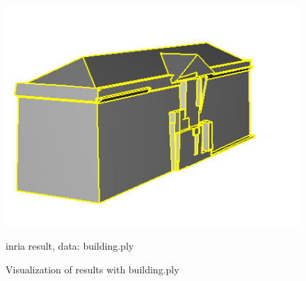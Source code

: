 \documentclass{article}
\begin{document}
\begin{figure}[H]
\begin{minipage}[t]{0.29\textwidth}
  \includegraphics[width=\textwidth]{../../images/screen_kinetic/building_inria.png}
  \caption*{inria result,\newline
  data: building.ply
  }
  \end{minipage}
  \caption{Visualization of results with building.ply}
  \end{figure}
\end{document}

